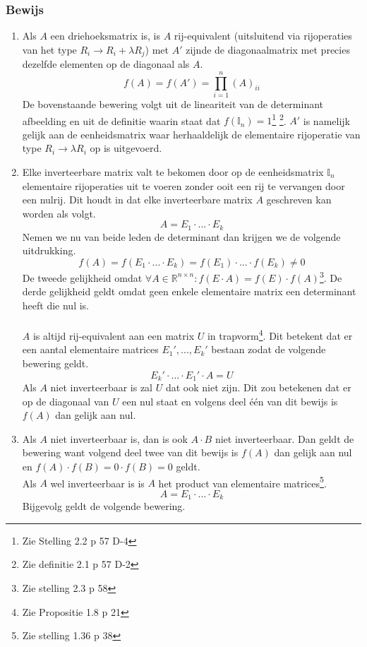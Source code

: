 \documentclass[lineaire_algebra_oplossingen.tex]{subfiles}
\begin{document}
\subsubsection*{Bewijs}
\begin{enumerate}
\item Als $A$ een driehoeksmatrix is, is $A$ rij-equivalent (uitsluitend via rijoperaties van het type $R_i \rightarrow R_i + \lambda R_j$) met $A'$ zijnde de diagonaalmatrix met precies dezelfde elementen op de diagonaal als $A$.
\[
f(A) = f(A') = \prod_{i=1}^n (A)_{ii}
\]
De bovenstaande bewering volgt uit de lineariteit van de determinant afbeelding en uit de definitie waarin staat dat $f(\mathbb{I}_n)=1$\footnote{Zie Stelling 2.2 p 57 D-4} \footnote{Zie definitie 2.1 p 57 D-2}. $A'$ is namelijk gelijk aan de eenheidsmatrix waar herhaaldelijk de elementaire rijoperatie van type $R_i \rightarrow \lambda R_i$ op is uitgevoerd.
\item Elke inverteerbare matrix valt te bekomen door op de eenheidsmatrix $\mathbb{I}_n$ elementaire rijoperaties uit te voeren zonder ooit een rij te vervangen door een nulrij. Dit houdt in dat elke inverteerbare matrix $A$ geschreven kan worden als volgt.
\[
A = E_1\cdot ... \cdot E_k
\]
Nemen we nu van beide leden de determinant dan krijgen we de volgende uitdrukking.
\[
f(A) = f(E_1\cdot ... \cdot E_k) = f(E_1)\cdot ... \cdot f(E_k) \neq 0
\]
De tweede gelijkheid omdat $\forall A\in \mathbb{R}^{n\times n}: f(E\cdot A) = f(E)\cdot f(A)$\footnote{Zie stelling 2.3 p 58}. De derde gelijkheid geldt omdat geen enkele elementaire matrix een determinant heeft die nul is.\\\\
$A$ is altijd rij-equivalent aan een matrix $U$ in trapvorm\footnote{Zie Propositie 1.8 p 21}. Dit betekent dat er een aantal elementaire matrices $E_1',...,E_k'$ bestaan zodat de volgende bewering geldt.
\[
E_k'\cdot ...\cdot E_1' \cdot A = U
\]
Als $A$ niet inverteerbaar is zal $U$ dat ook niet zijn. Dit zou betekenen dat er op de diagonaal van $U$ een nul staat en volgens deel \'e\'en van dit bewijs is $f(A)$ dan gelijk aan nul.
\item
Als $A$ niet inverteerbaar is, dan is ook $A\cdot B$ niet inverteerbaar. Dan geldt de bewering want volgend deel twee van dit bewijs is $f(A)$ dan gelijk aan nul en $f(A)\cdot f(B) = 0\cdot f(B) = 0$ geldt.\\
Als $A$ wel inverteerbaar is is $A$ het product van elementaire matrices\footnote{Zie stelling 1.36 p 38}.
\[
A = E_1\cdot ...\cdot E_k
\]
Bijgevolg geldt de volgende bewering.

\end{enumerate}
\end{document}
